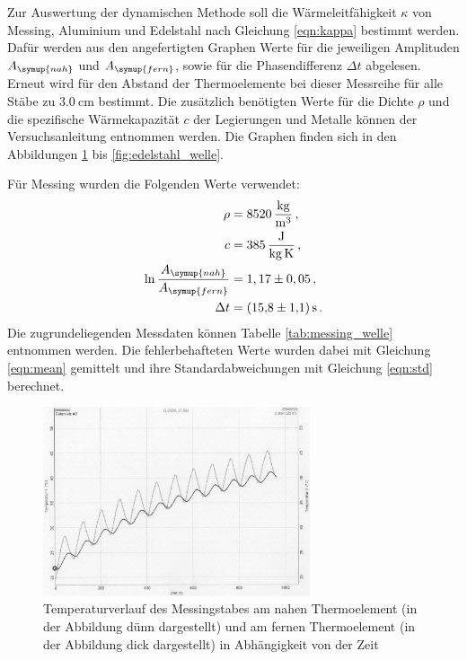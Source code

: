Zur Auswertung der dynamischen Methode soll die Wärmeleitfähigkeit $\kappa$ von
Messing, Aluminium und Edelstahl nach Gleichung \eqref{eqn:kappa} bestimmt werden.
Dafür werden aus den angefertigten Graphen Werte für die jeweiligen Amplituden
$A_{\symup{nah}}$ und $A_{\symup{fern}}$, sowie für die Phasendifferenz $\Delta t$ abgelesen. Erneut wird für den Abstand der
Thermoelemente bei dieser Messreihe für alle Stäbe zu $\SI{3.0}{\centi\meter}$ bestimmt.
Die zusätzlich benötigten Werte für die Dichte $\rho$ und die spezifische Wärmekapazität $c$
der Legierungen und Metalle können der Versuchsanleitung entnommen werden. Die Graphen
finden sich in den Abbildungen \ref{fig:messing_welle} bis \ref{fig:edelstahl_welle}.

Für Messing wurden die Folgenden Werte verwendet:
\begin{align}
  \rho &= \SI{8520}{\kilo\gram\per\cubic\meter}\,, \nonumber\\
  c &= \SI{385}{\joule\per\kilo\gram\per\kelvin}\,, \nonumber\\
  \ln{\frac{A_{\symup{nah}}}{A_{\symup{fern}}}} &= 1,17 \pm 0,05 \,, \nonumber\\
  \Delta t &= \SI{15.8(11)}{\second} \,. \nonumber
\end{align}
Die zugrundeliegenden Messdaten können Tabelle \ref{tab:messing_welle} entnommen
werden. Die fehlerbehafteten Werte wurden dabei mit Gleichung \eqref{eqn:mean} gemittelt
und ihre Standardabweichungen mit Gleichung \eqref{eqn:std} berechnet.

\begin{figure}
  \centering
  \includegraphics[width=0.7\textwidth]{data/t1undt2_welle.JPEG}
  \caption{Temperaturverlauf des Messingstabes am nahen Thermoelement (in der Abbildung dünn dargestellt)
  und am fernen Thermoelement (in der Abbildung dick dargestellt) in Abhängigkeit von der Zeit}
  \label{fig:messing_welle}
\end{figure}


